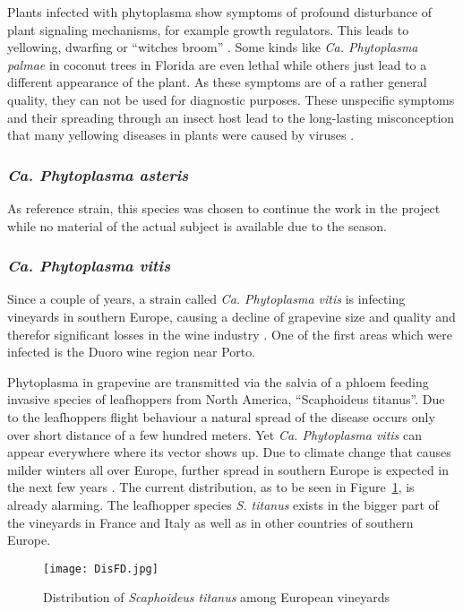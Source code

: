 \documentclass[a4paper]{article}
\begin{document}
Plants infected with phytoplasma show symptoms of profound disturbance of plant signaling mechanisms, for example growth regulators. 
This leads to yellowing, dwarfing or ``witches broom'' \cite{p24}.
Some kinds like \textit {Ca. Phytoplasma palmae} in coconut trees in Florida are even lethal while others just lead to a different appearance of the plant.
As these symptoms are of a rather general quality, they can not be used for diagnostic purposes. 
These unspecific symptoms and their spreading through an insect host lead to the long-lasting misconception that many yellowing diseases in plants were caused by viruses \cite{p13}.


 \subsubsection{\textit{Ca. Phytoplasma asteris}}
As reference strain, this species was chosen to continue the work in the project while no material of the actual subject is available due to the season. 

 \subsubsection{\textit{Ca. Phytoplasma vitis}}
Since a couple of years, a strain called \textit{Ca. Phytoplasma vitis} is infecting vineyards in southern Europe, causing a decline of grapevine size and quality and therefor significant losses in the wine industry \cite{p10}. 
One of the first areas which were infected is the Duoro wine region near Porto. 

Phytoplasma in grapevine are transmitted via the salvia of a phloem feeding invasive species of leafhoppers from North America, ``Scaphoideus titanus''.
Due to the leafhoppers flight behaviour a natural spread of the disease occurs only over short distance of a few hundred meters. 
Yet \textit{Ca. Phytoplasma vitis} can appear everywhere where its vector shows up. 
Due to climate change that causes milder winters all over Europe, further spread in southern Europe is expected in the next few years \cite{p10}. 
The current distribution, as to be seen in Figure~\ref{fig:disfd}, is already alarming. 
The leafhopper species \textit{S. titanus} exists in the bigger part of the vineyards in France and Italy as well as in other countries of southern Europe.

\begin{figure}[H]
	\centering
	\texttt{[image: DisFD.jpg]}
	\caption[Distribution of \textit{Scaphoideus titanus}]{Distribution of \textit{Scaphoideus titanus} among European vineyards \cite{p33}}
	\label{fig:disfd}
\end{figure}
\end{document}

